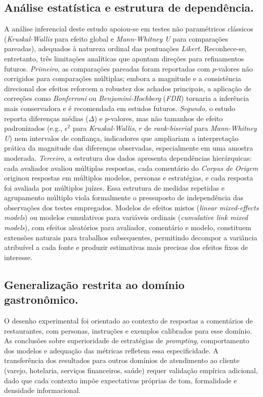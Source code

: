 \documentclass[12pt, a4paper]{article}
\numberwithin{equation}{section}
\begin{document}
 \subsection{Análise estatística e estrutura de dependência.}
 A análise inferencial deste estudo apoiou-se em testes não paramétricos clássicos 
(\textit{Kruskal-Wallis} para efeito global e \textit{Mann-Whitney U} para comparações pareadas), 
adequados à natureza ordinal das pontuações \textit{Likert}. Reconhece-se, entretanto, três 
limitações analíticas que apontam direções para refinamentos futuros. \textit{Primeiro}, as 
comparações pareadas foram reportadas com $p$-valores não corrigidos para comparações múltiplas; 
embora a magnitude e a consistência direcional dos efeitos reforcem a robustez dos achados 
principais, a aplicação de correções como \textit{Bonferroni} ou \textit{Benjamini-Hochberg} 
(\textit{FDR}) tornaria a inferência mais conservadora e é recomendada em estudos futuros. 
\textit{Segundo}, o estudo reporta diferenças médias ($\Delta$) e $p$-valores, mas não tamanhos de
 efeito padronizados (e.g., $\epsilon^2$ para \textit{Kruskal-Wallis}, $r$ de 
\textit{rank-biserial} para \textit{Mann-Whitney U}) nem intervalos de confiança, indicadores que 
ampliariam a interpretação prática da magnitude das diferenças observadas, especialmente em uma 
amostra moderada. \textit{Terceiro}, a estrutura dos dados apresenta dependências hierárquicas: 
cada avaliador avaliou múltiplas respostas, cada comentário do \textit{Corpus de Origem} originou 
respostas em múltiplos modelos, personas e estratégias, e cada resposta foi avaliada por múltiplos
 juízes. Essa estrutura de medidas repetidas e agrupamento múltiplo viola formalmente o 
pressuposto de independência das observações dos testes empregados. Modelos de efeitos mistos 
(\textit{linear mixed-effects models}) ou modelos cumulativos para variáveis ordinais 
(\textit{cumulative link mixed models}), com efeitos aleatórios para avaliador, comentário e 
modelo, constituem extensões naturais para trabalhos subsequentes, permitindo decompor a variância
 atribuível a cada fonte e produzir estimativas mais precisas dos efeitos fixos de interesse.
 
 \subsection{Generalização restrita ao domínio gastronômico.}
 O desenho experimental foi orientado ao contexto de respostas a comentários de restaurantes, com 
personas, instruções e exemplos calibrados para esse domínio. As conclusões sobre superioridade de
 estratégias de \textit{prompting}, comportamento dos modelos e adequação das métricas refletem 
essa especificidade. A transferência dos resultados para outros domínios de atendimento ao cliente
 (varejo, hotelaria, serviços financeiros, saúde) requer validação empírica adicional, dado que 
cada contexto impõe expectativas próprias de tom, formalidade e densidade informacional.
 
\end{document}
